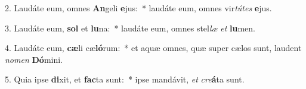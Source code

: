 
2. Laudáte eum, omnes \textbf{An}geli \textbf{e}jus:~* laudáte eum, omnes vir\textit{tú}\textit{tes} \textbf{e}jus.

3. Laudáte eum, \textbf{sol} et \textbf{lu}na:~* laudáte eum, omnes stel\textit{læ} \textit{et} \textbf{lu}men.

4. Laudáte eum, \textbf{cæ}li cæ\textbf{ló}rum:~* et aquæ omnes, quæ super cælos sunt, laudent \textit{no}\textit{men} \textbf{Dó}mini.

5. Quia ipse \textbf{di}xit, et \textbf{fac}ta sunt:~* ipse mandávit, \textit{et} \textit{cre}\textbf{á}ta sunt.

